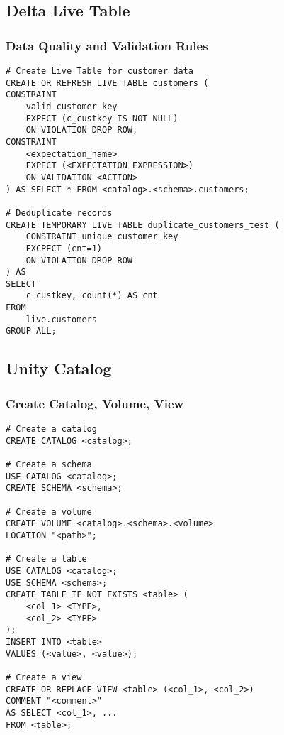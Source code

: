 \documentclass[11pt]{scrartcl}
\begin{document}
\newpage
\subsection{Delta Live Table} \label{delta_live_sql}
\subsubsection{Data Quality and Validation Rules}
\begin{lstlisting}
# Create Live Table for customer data
CREATE OR REFRESH LIVE TABLE customers (
CONSTRAINT 
	valid_customer_key 
	EXPECT (c_custkey IS NOT NULL)
	ON VIOLATION DROP ROW,
CONSTRAINT
	<expectation_name>
	EXPECT (<EXPECTATION_EXPRESSION>)
	ON VALIDATION <ACTION>
) AS SELECT * FROM <catalog>.<schema>.customers;

# Deduplicate records
CREATE TEMPORARY LIVE TABLE duplicate_customers_test (
	CONSTRAINT unique_customer_key 
	EXCPECT (cnt=1)
	ON VIOLATION DROP ROW
) AS
SELECT
	c_custkey, count(*) AS cnt
FROM
	live.customers
GROUP ALL;
\end{lstlisting}


\newpage
\subsection{Unity Catalog} \label{unity_sql}
\subsubsection{Create Catalog, Volume, View}
\begin{lstlisting}
# Create a catalog
CREATE CATALOG <catalog>;

# Create a schema
USE CATALOG <catalog>;
CREATE SCHEMA <schema>;

# Create a volume
CREATE VOLUME <catalog>.<schema>.<volume> 
LOCATION "<path>";

# Create a table
USE CATALOG <catalog>;
USE SCHEMA <schema>;
CREATE TABLE IF NOT EXISTS <table> (
	<col_1> <TYPE>,
	<col_2> <TYPE>
);
INSERT INTO <table>
VALUES (<value>, <value>);

# Create a view
CREATE OR REPLACE VIEW <table> (<col_1>, <col_2>)
COMMENT "<comment>"
AS SELECT <col_1>, ...
FROM <table>;
\end{lstlisting}
\end{document}
